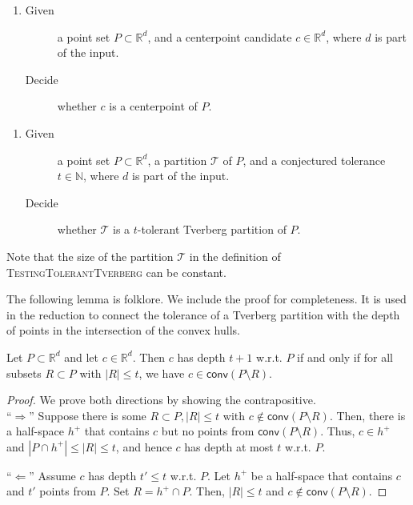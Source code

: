 \documentclass[oribibl,envcountsame,envcountsect]{llncs}
\newcommand{\mc}[1]{\ensuremath{\mathcal{#1}}}
\newcommand{\conv}{\mathsf{conv}}
\newcommand{\real}{\mathbb{R}}
\newcommand{\nat}{\mathbb{N}}
\begin{document}
\begin{problem}
  \begin{enumerate}
    \item[]
      \begin{description}
    \item[Given] a point set $P\subset \real^d$, and a centerpoint candidate
      $c\in\real^d$, where $d$ is part of the input.
    \item[Decide] whether $c$ is a centerpoint of $P$.
  \end{description}
  \end{enumerate}
\end{problem}

\begin{problem}
  \begin{enumerate}
    \item[]
      \begin{description}
    \item[Given] a point set $P\subset \real^d$, a
      partition $\mc{T}$ of $P$, and a conjectured tolerance $t\in\nat$, where
      $d$ is part of the input.
    \item[Decide] whether $\mc{T}$ is a $t$-tolerant Tverberg partition of $P$.
  \end{description}
  \end{enumerate}
\end{problem}

Note that the size of the partition $\mc{T}$ in the definition of
\textsc{TestingTolerantTverberg} can be constant.

The following lemma is folklore. We include the proof for completeness.
It is used in the reduction to connect the tolerance of a
Tverberg partition with the depth of points in the intersection of the convex
hulls.

\begin{lemma}\label{com:lem:depth}
  Let $P\subset\real^d$ and let $c\in\real^d$. Then $c$ has depth $t+1$ w.r.t.
  $P$ if and only if for all subsets $R\subset P$ with $|R| \leq t$, we have $c
  \in \conv(P \setminus R)$.
\end{lemma}
\begin{proof}
  We prove both directions by showing the contrapositive.\\
  \indent``$\Rightarrow$''
        Suppose there is some $R\subset P, |R|\leq t$ with $c\notin \conv(P
        \setminus R)$. Then, there is a
        half-space $h^+$ that contains $c$ but no points from $\conv(P \setminus R)$.
        Thus,
        $c\in h^+$ and $| P \cap h^+ | \leq |R| \leq t$,
        and hence $c$ has depth at most $t$ w.r.t. $P$.

    ``$\Leftarrow$''
        Assume $c$ has depth $t'\leq t$ w.r.t. $P$. Let $h^+$ be a half-space that
        contains $c$ and $t'$ points from $P$. Set $R=h^+ \cap P$. Then,
        $|R|\leq t$ and $c \notin \conv(P \setminus R)$.
\end{proof}
\end{document}
